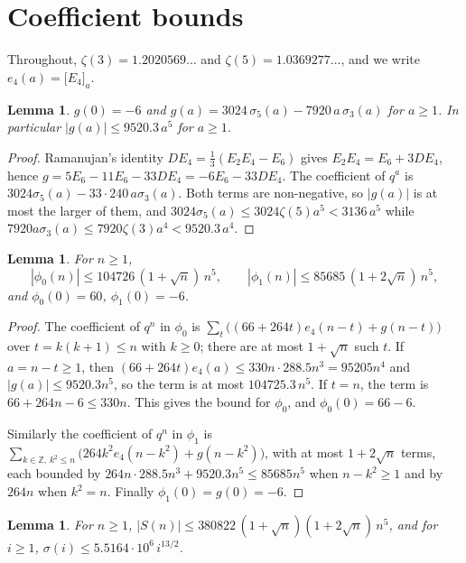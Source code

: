\documentclass[11pt]{amsart}
\newtheorem{lemma}[theorem]{Lemma}
\theoremstyle{definition}
\newcommand{\ZZ}{\mathbb{Z}}
\newcommand{\coef}[2]{\big[#1\big]_{#2}}
\begin{document}
\section{Coefficient bounds}\label{app:bounds}

Throughout, $\zeta(3)=1.2020569\ldots$ and $\zeta(5)=1.0369277\ldots$, and we write $e_4(a)=\coef{E_4}a$.

\begin{lemma}\label{lem:g}
$g(0)=-6$ and $g(a)=3024\,\sigma_5(a)-7920\,a\,\sigma_3(a)$ for $a\ge1$. In particular $|g(a)|\le9520.3\,a^5$ for $a\ge1$.
\end{lemma}

\begin{proof}
Ramanujan's identity $DE_4=\frac13(E_2E_4-E_6)$ \cite[Section~5.2]{Zag08} gives $E_2E_4=E_6+3DE_4$, hence $g=5E_6-11E_6-33DE_4=-6E_6-33DE_4$. The coefficient of $q^a$ is $3024\sigma_5(a)-33\cdot240\,a\sigma_3(a)$. Both terms are non-negative, so $|g(a)|$ is at most the larger of them, and $3024\sigma_5(a)\le3024\zeta(5)a^5<3136\,a^5$ while $7920a\sigma_3(a)\le7920\zeta(3)a^4<9520.3\,a^4$.
\end{proof}

\begin{lemma}\label{lem:phi}
For $n\ge1$,
\[
|\phi_0(n)|\le104726\,(1+\sqrt n)\,n^5,\qquad |\phi_1(n)|\le85685\,(1+2\sqrt n)\,n^5,
\]
and $\phi_0(0)=60$, $\phi_1(0)=-6$.
\end{lemma}

\begin{proof}
The coefficient of $q^n$ in $\phi_0$ is $\sum_{t}\big((66+264t)e_4(n-t)+g(n-t)\big)$ over $t=k(k+1)\le n$ with $k\ge0$; there are at most $1+\sqrt n$ such $t$. If $a=n-t\ge1$, then $(66+264t)e_4(a)\le330n\cdot288.5n^3=95205n^4$ and $|g(a)|\le9520.3n^5$, so the term is at most $104725.3\,n^5$. If $t=n$, the term is $66+264n-6\le330n$. This gives the bound for $\phi_0$, and $\phi_0(0)=66-6$.

Similarly the coefficient of $q^n$ in $\phi_1$ is $\sum_{k\in\ZZ,\,k^2\le n}\big(264k^2e_4(n-k^2)+g(n-k^2)\big)$, with at most $1+2\sqrt n$ terms, each bounded by $264n\cdot288.5n^3+9520.3n^5\le85685n^5$ when $n-k^2\ge1$ and by $264n$ when $k^2=n$. Finally $\phi_1(0)=g(0)=-6$.
\end{proof}

\begin{lemma}\label{lem:Sbound}
For $n\ge1$, $|S(n)|\le380822\,(1+\sqrt n)(1+2\sqrt n)\,n^5$, and for $i\ge1$, $\sigma(i)\le5.5164\cdot10^6\,i^{13/2}$.
\end{lemma}
\end{document}
